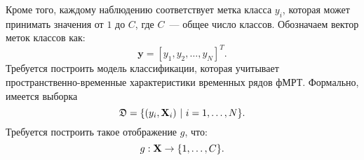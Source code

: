 Кроме того, каждому наблюдению соответствует метка класса $y_i$, которая может принимать значения от $1$ до $C$, где $C$~--- общее число классов. Обозначаем вектор меток классов как:
$$\bm{y} = [y_1, y_2, \ldots, y_N]^T.$$
Требуется построить модель классификации, которая учитывает\\ пространственно-временные характеристики временных рядов фМРТ. Формально, имеется выборка 
\[ \mathfrak{D} = \{(y_i, \mathbf{X}_i) \ | \ i = 1, \ldots, N \}. \]
Требуется построить такое отображение $g$, что:
\[g: \mathbf{X} \rightarrow \{1,\dots, C\}.\] 

\newpage

